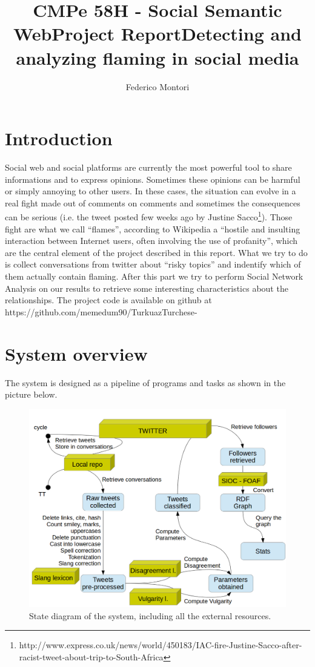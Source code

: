\documentclass[a4paper,10pt, english]{report}
\title{CMPe 58H - Social Semantic Web\newline Project Report\newline Detecting and analyzing flaming in social media}
\author{Federico Montori}
\begin{document}
\maketitle

\section{Introduction}
Social web and social platforms are currently the most powerful tool to share informations and to express opinions.
Sometimes these opinions can be harmful or simply annoying to other users.
In these cases, the situation can evolve in a real fight made out of comments on comments and sometimes the consequences can be serious (i.e. the tweet posted few weeks ago by Justine Sacco\footnote{http://www.express.co.uk/news/world/450183/IAC-fire-Justine-Sacco-after-racist-tweet-about-trip-to-South-Africa}).
Those fight are what we call ``flames'', according to Wikipedia a ``hostile and insulting interaction between Internet users, often involving the use of profanity'', which are the central element of the project described in this report.
\newline \newline
What we try to do is collect conversations from twitter about ``risky topics'' and indentify which of them actually contain flaming.
After this part we try to perform Social Network Analysis on our results to retrieve some interesting characteristics about the relationships.
\newline \newline 
The project code is available on github at https://github.com/memedum90/TurkuazTurchese-

\section{System overview}
The system is designed as a pipeline of programs and tasks as shown in the picture below.
\begin{figure}[h!]
 \centering
    \includegraphics[scale=0.5]{diag1.png}
    \caption{State diagram of the system, including all the external resources.}
\end{figure}
\end{document}
